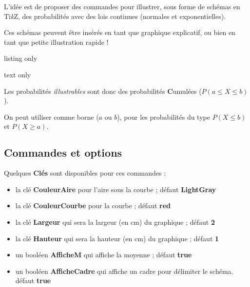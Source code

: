 \documentclass[a4paper,french,11pt]{article}
\providecommand\tikzlogo{Ti\textit{k}Z}
\let\TikZ\tikzlogo
\newcommand\ctex[1]{\tcbox[vignettelatex]{#1}}
\newcommand\Cle[1]{{\bfseries\sffamily\textlangle \textcolor{orange!75!black}{#1}\textrangle}}
\begin{document}
\begin{tipblock}
L'idée est de proposer des commandes pour illustrer, sous forme de schémas en \TikZ, des probabilités avec des lois continues (normales et exponentielles).

\smallskip

Ces \og schémas \fg{} peuvent être insérés en tant que graphique explicatif, ou bien en tant que petite illustration rapide !
\end{tipblock}

\begin{PresCodeTexPL}{listing only}

\end{PresCodeTexPL}

\begin{PresCodeSortiePL}{text only}
\hfill{}\hspace{3cm}\hfill~
\end{PresCodeSortiePL}

\begin{cautionblock}
Les probabilités \textit{illustrables} sont donc des probabilités \textbf{C}umulées ($P(a\leqslant X\leqslant b)$).

\smallskip

On peut utiliser \ctex{*} comme borne ($a$ ou $b$), pour les probabilités du type $P(X\leqslant b)$ et $P(X \geqslant a)$.
\end{cautionblock}

\subsection{Commandes et options}

\begin{cautionblock}
Quelques \Cle{Clés} sont disponibles pour ces commandes :

\begin{itemize}
	\item la clé \Cle{CouleurAire} pour l'aire sous la courbe ; \hfill{}défaut \Cle{LightGray}
	\item la clé \Cle{CouleurCourbe} pour la courbe ; \hfill{}défaut \Cle{red}
	\item la clé \Cle{Largeur} qui sera la largeur (en cm) du graphique ; \hfill{}défaut \Cle{2}
	\item la clé \Cle{Hauteur} qui sera la hauteur (en cm) du graphique ; \hfill{}défaut \Cle{1}
	\item un booléen \Cle{AfficheM} qui affiche la moyenne ; \hfill{}défaut \Cle{true}
	\item un booléen \Cle{AfficheCadre} qui affiche un cadre pour délimiter le schéma. \hfill{}défaut \Cle{true}
\end{itemize}
\vspace*{-\baselineskip}\leavevmode
\end{cautionblock}
\end{document}
